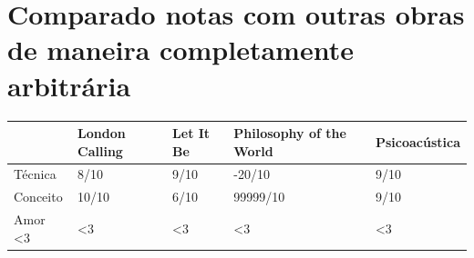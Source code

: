 \documentclass{article}
\begin{document}
\section{Comparado notas com outras obras de maneira completamente arbitrária}
\begin{table}[h]
\begin{tabular}{|l|l|l|l|l|}
\hline
\textbf{}         & \textbf{London Calling} & \textbf{Let It Be} & \textbf{Philosophy of the World} & \textbf{Psicoacústica} \\ \hline
Técnica           & 8/10                    & 9/10               & -20/10                           & 9/10                   \\ \hline
Conceito          & 10/10                   & 6/10               & 99999/10                         & 9/10                   \\ \hline
Amor \textless{}3 & \textless{}3            & \textless{}3       & \textless{}3                     & \textless{}3           \\ \hline
\end{tabular}
\end{table}



\end{document}
